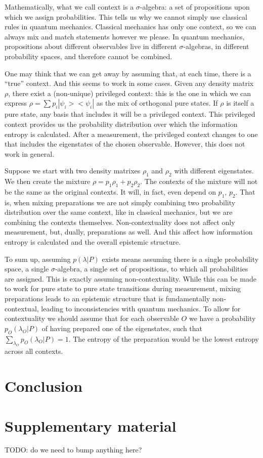 \documentclass[10pt,twocolumn, nofootinbib]{revtex4-2}
\begin{document}
Mathematically, what we call context is a $\sigma$-algebra: a set of propositions upon which we assign probabilities. This tells us why we cannot simply use classical rules in quantum mechanics. Classical mechanics has only one context, so we can always mix and match statements however we please. In quantum mechanics, propositions about different observables live in different $\sigma$-algebras, in different probability spaces, and therefore cannot be combined.

One may think that we can get away by assuming that, at each time, there is a ``true'' context. And this seems to work in some cases. Given any density matrix $\rho$, there exist a (non-unique) privileged context: this is the one in which we can express $\rho = \sum p_i |\psi_i > < \psi_i|$ as the mix of orthogonal pure states. If $\rho$ is itself a pure state, any basis that includes it will be a privileged context. This privileged context provides us the probability distribution over which the information entropy is calculated. After a measurement, the privileged context changes to one that includes the eigenstates of the chosen observable. However, this does not work in general.

Suppose we start with two density matrixes $\rho_1$ and $\rho_2$ with different eigenstates. We then create the mixture $\rho = p_1 \rho_1 + p_2 \rho_2$. The contexts of the mixture will not be the same as the original contexts. It will, in fact, even depend on $p_1$, $p_2$. That is, when mixing preparations we are not simply combining two probability distribution over the same context, like in classical mechanics, but we are combining the contexts themselves. Non-contextuality does not affect only measurement, but, dually, preparations as well. And this affect how information entropy is calculated and the overall epistemic structure.


To sum up, assuming $p(\lambda|P)$ exists means assuming there is a single probability space, a single $\sigma$-algebra, a single set of propositions, to which all probabilities are assigned. This is exactly assuming non-contextuality. While this can be made to work for pure state to pure state transitions during measurement, mixing preparations leads to an epistemic structure that is fundamentally non-contextual, leading to inconsistencies with quantum mechanics. To allow for contextuality we should assume that for each observable $O$ we have a probability $p_O(\lambda_O|P)$ of having prepared one of the eigenstates, such that $\sum_{\lambda_O} p_O(\lambda_O|P) = 1$. The entropy of the preparation would be the lowest entropy across all contexts.



\section{Conclusion}

\section*{Supplementary material}

TODO: do we need to bump anything here?



\end{document}
